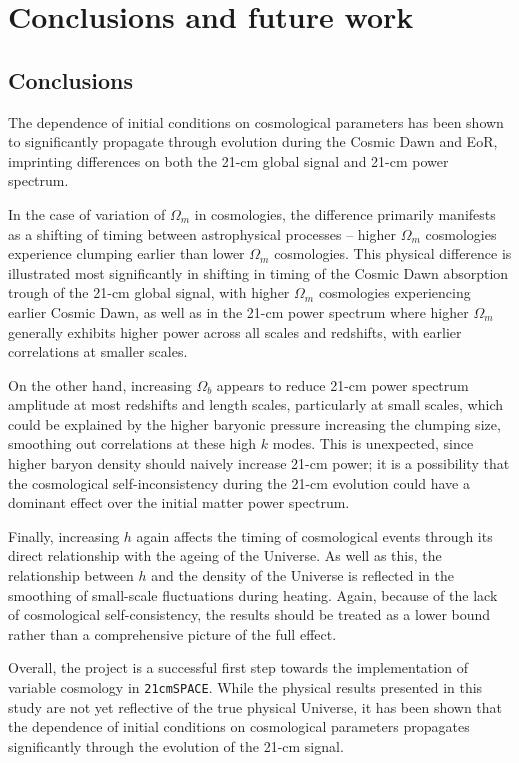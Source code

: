 \documentclass[floats,floatfix,showpacs,amssymb,prd,superscriptaddress,nofootinbib, 11pt]{revtex4-2} %
\newcommand{\code}{\texttt}
\begin{document}
\newpage
\section{Conclusions and future work}
\subsection{Conclusions}
The dependence of initial conditions on cosmological parameters has been shown to significantly propagate through evolution during the Cosmic Dawn and EoR, imprinting differences on both the 21-cm global signal and 21-cm power spectrum. 

In the case of variation of $\Omega_m$ in cosmologies, the difference primarily manifests as a shifting of timing between astrophysical processes -- higher $\Omega_m$ cosmologies experience clumping earlier than lower $\Omega_m$ cosmologies. This physical difference is illustrated most significantly in shifting in timing of the Cosmic Dawn absorption trough of the 21-cm global signal, with higher $\Omega_m$ cosmologies experiencing earlier Cosmic Dawn, as well as in the 21-cm power spectrum where higher $\Omega_m$ generally exhibits higher power across all scales and redshifts, with earlier correlations at smaller scales.

On the other hand, increasing $\Omega_b$ appears to reduce 21-cm power spectrum amplitude at most redshifts and length scales, particularly at small scales, which could be explained by the higher baryonic pressure increasing the clumping size, smoothing out correlations at these high $k$ modes. This is unexpected, since higher baryon density should naively increase 21-cm power; it is a possibility that the cosmological self-inconsistency during the 21-cm evolution could have a dominant effect over the initial matter power spectrum.

Finally, increasing $h$ again affects the timing of cosmological events through its direct relationship with the ageing of the Universe. As well as this, the relationship between $h$ and the density of the Universe is reflected in the smoothing of small-scale fluctuations during heating. Again, because of the lack of cosmological self-consistency, the results should be treated as a lower bound rather than a comprehensive picture of the full effect.

Overall, the project is a successful first step towards the implementation of variable cosmology in \code{21cmSPACE}. While the physical results presented in this study are not yet reflective of the true physical Universe, it has been shown that the dependence of initial conditions on cosmological parameters propagates significantly through the evolution of the 21-cm signal. 
\end{document}
